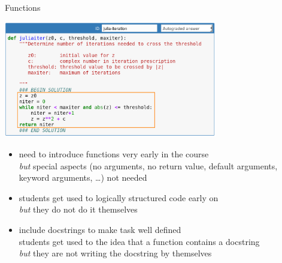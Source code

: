 \documentclass[svgnames]{beamer}
\newcommand\but{\alert{\textit{but}} }
\begin{document}
\begin{frame}{Functions}
 \begin{center}
  \includegraphics[width=0.7\textwidth]{answer_tests_function}
 \end{center}

 \vspace{-0.4truecm}
 \begin{itemize}
  \item need to introduce functions very early in the course\\
	\but special aspects (no arguments, no return value, default arguments,
	keyword arguments, \dots) not needed
  \item students get used to logically structured code early on\\
	\but they do not do it themselves
  \item include docstrings to make task well defined\\
	students get used to the idea that a function contains a docstring\\
        \but they are not writing the docstring by themselves
 \end{itemize}
\end{frame}
\end{document}
